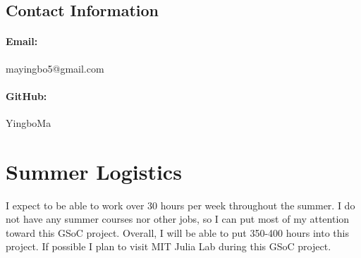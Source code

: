 \documentclass[12pt]{article}
\begin{document}
\subsection{Contact Information}
\paragraph{Email:} mayingbo5@gmail.com
\paragraph{GitHub:} YingboMa

\section{Summer Logistics}
I expect to be able to work over 30 hours per week throughout the summer. I do
not have any summer courses nor other jobs, so I can put most of my attention
toward this GSoC project. Overall, I will be able to put 350-400 hours into
this project. If possible I plan to visit MIT Julia Lab during this GSoC
project.


\end{document}
